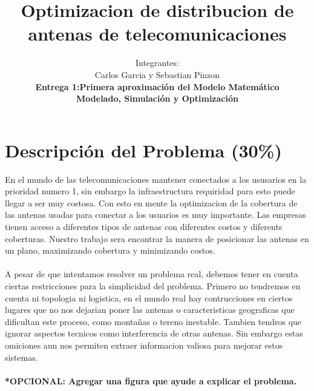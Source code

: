 \documentclass[runningheads]{llncs}
\begin{document}
%
\title{Optimizacion de distribucion de antenas de telecomunicaciones}
%
%
\author{Integrantes:\\ Carlos Garcia y Sebastian Pinzon \\
	\textbf{Entrega 1:Primera aproximaci\'{o}n del Modelo Matem\'{a}tico  \\Modelado, Simulaci\'{o}n y Optimizaci\'{o}n} \\}
%
%
%
\maketitle              %
%
%
%
%
\section{Descripci\'{o}n del Problema (30\%)}
En el mundo de las telecomunicaciones mantener conectados a los ususarios en la prioridad numero 1, sin embargo la infraestructura requiridad para esto puede llegar a ser muy costosa. Con esto en mente la optimizacion de la cobertura de las antenas usadas para conectar a los usuarios es muy importante. Las empresas tienen acceso a diferentes tipos de antenas con diferentes costos y diferents coberturas. Nuestro trabajo sera encontrar la manera de posicionar las antenas en un plano, maximizando cobertura y minimizando costos.
\\ \\
A pesar de que intentamos resolver un problema real, debemos tener en cuenta ciertas restricciones para la simplicidad del problema. Primero no tendremos en cuenta ni topologia ni logistica, en el mundo real hay contrucciones en ciertos lugares que no nos dejarian poner las antenas o caracteristicas geograficas que dificultan este proceso, como montañas o tereno inestable. Tambien tendros que ignorar aspectos tecnicos como interferencia de otras antenas. Sin embargo estas omiciones aun nos permiten extraer informacion valiosa para mejorar estos sistemas.
\\ \\
\textbf{*OPCIONAL: Agregar una figura que ayude a explicar el problema.}
\end{document}
